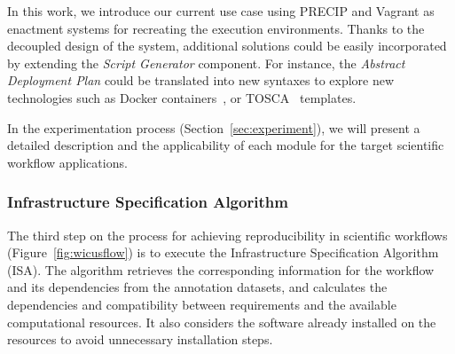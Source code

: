 In this work, we introduce our current use case using PRECIP and Vagrant 
as enactment systems for recreating the execution environments. Thanks to
the decoupled design of the system, additional solutions could be easily 
incorporated by extending the \emph{Script Generator} component. For instance,
the \emph{Abstract Deployment Plan} could be translated into new syntaxes to
explore new technologies such as Docker containers~\cite{Merkel2014}, or 
TOSCA~\cite{TOSCA} templates.
 
 
In the experimentation process (Section~\ref{sec:experiment}), we will present 
a detailed description and the applicability of each module for the target 
scientific workflow applications.


\subsubsection{Infrastructure Specification Algorithm}


The third step on the process for achieving reproducibility in scientific workflows 
(Figure~\ref{fig:wicusflow}) is to execute the Infrastructure Specification Algorithm 
(ISA). The algorithm retrieves the corresponding information for the 
workflow and its dependencies from the annotation datasets, and calculates the 
dependencies and compatibility between requirements and the available 
computational resources. It also considers the software already installed on the
resources to avoid unnecessary installation steps.

